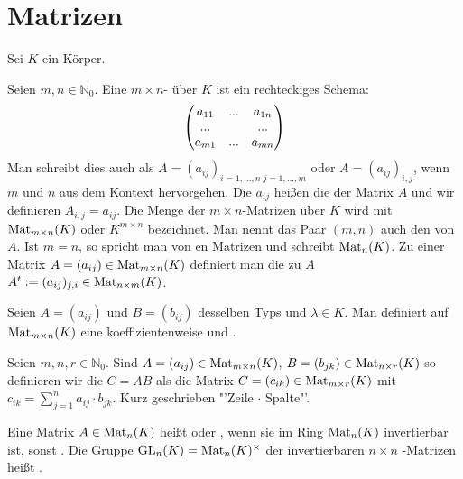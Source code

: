 \section{Matrizen}

Sei $K$ ein Körper.

\begin{definition}[Matrix]
	Seien $m,n \in \mathbb N_0$. Eine $m\times n$- über $K$ ist ein rechteckiges 
	Schema:
	\begin{align}
		\begin{pmatrix}
		a_{11} & ... & a_{1n}\\
		... &  & ...\\
		a_{m1} & ... & a_{mn}\\
		\end{pmatrix}\notag
	\end{align}
	Man schreibt dies auch als $A=(a_{ij})_{i=1,...,n \; j=1,...,m}$ oder $A=(a_{ij})_{i,j}$, wenn $m$ und $n$ 
	aus dem Kontext hervorgehen. Die $a_{ij}$ heißen die  der Matrix $A$ und wir definieren $A_{i,j}=
	a_{ij}$. Die Menge der $m\times n$-Matrizen über $K$ wird mit $\operatorname{Mat}_{m\times n}(K)$ oder $K^{m\times n}$ 
	bezeichnet. Man nennt das Paar $(m,n)$ auch den  von $A$. Ist $m=n$, so spricht man von en 
	Matrizen und schreibt $\operatorname{Mat}_n(K)$. Zu einer Matrix $A=(a_{ij}) \in \operatorname{Mat}_{m\times n}(K)$ definiert man die zu $A$ 
	 $A^t := (a_{ij})_{j,i} \in \operatorname{Mat}_{n\times m}(K)$.
\end{definition}

\begin{definition}
	Seien $A=(a_{ij})$ und $B=(b_{ij})$ desselben Typs und 
	$\lambda \in K$. Man definiert auf $\operatorname{Mat}_{m\times n}(K)$ eine koeffizientenweise  und .
\end{definition}

\begin{definition}[Matrizenmultiplikation]
	Seien $m,n,r \in \mathbb N_0$. Sind $A=(a_{ij})\in \operatorname{Mat}_{m\times n}(K)$, 
	$B=(b_{jk})\in \operatorname{Mat}_{n\times r}(K)$ so definieren wir die  $C=AB$ als die Matrix $C=(c_{ik})\in \operatorname{Mat}_{m\times r}(K)$ mit 
	$c_{ik}=\sum_{j=1}^n a_{ij}\cdot b_{jk}$. Kurz geschrieben "'Zeile $\cdot$ Spalte"'.
\end{definition}

\begin{definition}[invertierbar]
	Eine Matrix $A\in \operatorname{Mat}_n(K)$ heißt  oder , wenn sie im Ring 
	$\operatorname{Mat}_n(K)$ invertierbar ist, sonst . Die Gruppe $\operatorname{GL}_n(K)=\operatorname{Mat}_n(K)^{\times}$ der invertierbaren $n\times n$
	-Matrizen heißt .
\end{definition}